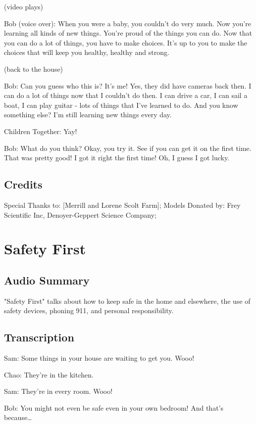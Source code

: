 (video plays)

Bob (voice over): When you were a baby, you couldn't do very much. Now you're learning all kinds of new things. You're proud of the things you can do. Now that you can do a lot of things, you have to make choices. It's up to you to make the choices that will keep you healthy, healthy and strong.

(back to the house)

Bob: Can you guess who this is? It's me! Yes, they did have cameras back then. I can do a lot of things now that I couldn't do then. I can drive a car, I can sail a boat, I can play guitar - lots of things that I've learned to do. And you know something else? I'm still learning new things every day.

Children Together: Yay!

Bob: What do you think? Okay, you try it. See if you can get it on the first time. That was pretty good! I got it right the first time! Oh, I guess I got lucky.

\subsection{Credits}

Special Thanks to: [Merrill and Lorene Scolt Farm];
Models Donated by: Frey Scientific Inc, Denoyer-Geppert Science Company;

\section{Safety First}

\subsection{Audio Summary}

"Safety First" talks about how to keep safe in the home and elsewhere, the use of safety devices, phoning 911, and personal responsibility.

\subsection{Transcription}

Sam: Some things in your house are waiting to get you. Wooo!

Chao: They're in the kitchen.

Sam: They're in every room. Wooo!

Bob: You might not even be safe even in your own bedroom! And that's because\dots

